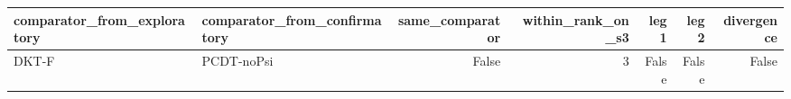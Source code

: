\begin{tabular}{llrrrrr}
\toprule
comparator\_from\_exploratory & comparator\_from\_confirmatory & same\_comparator & within\_rank\_on\_s3 & leg1 & leg2 & divergence \\
\midrule
DKT-F & PCDT-noPsi & False & 3 & False & False & False \\
\bottomrule
\end{tabular}
